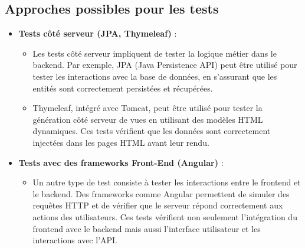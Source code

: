 \documentclass[a4paper,12pt]{article}
\begin{document}
\subsection{Approches possibles pour les tests}
\begin{itemize}
    \item \textbf{Tests côté serveur (JPA, Thymeleaf)} : 
    \begin{itemize}
        \item Les tests côté serveur impliquent de tester la logique métier dans le backend. Par exemple, JPA (Java Persistence API) peut être utilisé pour tester les interactions avec la base de données, en s'assurant que les entités sont correctement persistées et récupérées. 
        \item Thymeleaf, intégré avec Tomcat, peut être utilisé pour tester la génération côté serveur de vues en utilisant des modèles HTML dynamiques. Ces tests vérifient que les données sont correctement injectées dans les pages HTML avant leur rendu.
    \end{itemize}
    
    \item \textbf{Tests avec des frameworks Front-End (Angular)} : 
    \begin{itemize}
        \item Un autre type de test consiste à tester les interactions entre le frontend et le backend. Des frameworks comme Angular permettent de simuler des requêtes HTTP et de vérifier que le serveur répond correctement aux actions des utilisateurs. Ces tests vérifient non seulement l'intégration du frontend avec le backend mais aussi l'interface utilisateur et les interactions avec l'API.
    \end{itemize}
\end{itemize}
\end{document}
